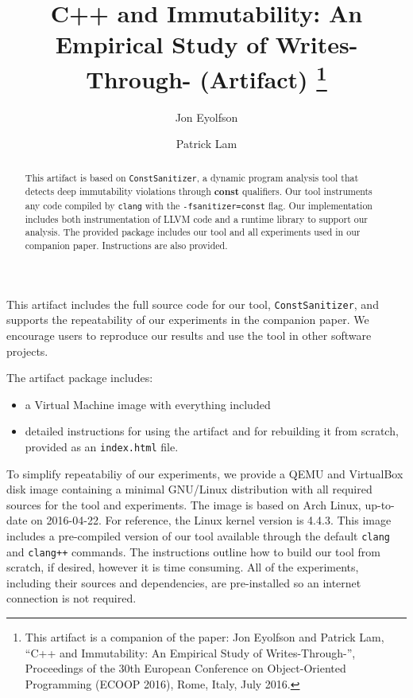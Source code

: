 \documentclass[a4paper,UKenglish]{lipics-v2016}
\title{C++ \const{} and Immutability: An Empirical Study of
       Writes-Through-\const{} (Artifact)
  \footnote{This artifact is a companion of the paper: Jon Eyolfson and Patrick
            Lam, ``C++ \const{} and Immutability: An Empirical Study of
            Writes-Through-\const{}'', Proceedings of the 30th European
            Conference on Object-Oriented Programming (ECOOP 2016), Rome, Italy,
            July 2016.}}
\author[1]{Jon Eyolfson}
\author[2]{Patrick Lam}
\affil[1]{University of Waterloo\\
  Waterloo, ON, Canada\\
  \texttt{jeyolfso@uwaterloo.ca}}
\affil[2]{University of Waterloo\\
  Waterloo ON, Canada\\
  \texttt{patrick.lam@uwaterloo.ca}}
\newcommand{\const}{{\bfseries \ttfamily const}}
\begin{document}
\maketitle

\begin{abstract}
  This artifact is based on {\tt ConstSanitizer}, a dynamic program analysis
  tool that detects deep immutability violations through \const{} qualifiers.
  Our tool instruments any code compiled by \texttt{clang} with the
  \texttt{-fsanitizer=const} flag. Our implementation includes both
  instrumentation of LLVM code and a runtime library to support our analysis.
  The provided package includes our tool and all experiments used in our
  companion paper. Instructions are also provided.
\end{abstract}

\begin{scope}
  This artifact includes the full source code for our tool,
  \texttt{ConstSanitizer}, and supports the repeatability of our experiments in
  the companion paper. We encourage users to reproduce our results and use the
  tool in other software projects.
\end{scope}

\begin{content}
  The artifact package includes:
  \begin{itemize}
    \item a Virtual Machine image with everything included
    \item detailed instructions for using the artifact and for rebuilding it
          from scratch, provided as an {\tt index.html} file.
  \end{itemize}

  To simplify repeatabiliy of our experiments, we provide a QEMU and VirtualBox
  disk image containing a minimal GNU/Linux distribution with all required
  sources for the tool and experiments. The image is based on Arch Linux,
  up-to-date on 2016-04-22. For reference, the Linux kernel version is 4.4.3.
  This image includes a pre-compiled version of our tool available through the
  default \texttt{clang} and \texttt{clang++} commands. The instructions outline
  how to build our tool from scratch, if desired, however it is time consuming.
  All of the experiments, including their sources and dependencies, are
  pre-installed so an internet connection is not required.
\end{content} 
\end{document}
